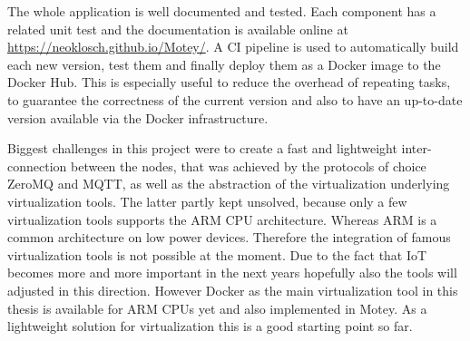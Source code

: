 The whole application is well documented and tested.
Each component has a related unit test and the documentation is available online at \url{https://neoklosch.github.io/Motey/}.
A \ac{CI} pipeline is used to automatically build each new version, test them and finally deploy them as a Docker image to the Docker Hub.
This is especially useful to reduce the overhead of repeating tasks, to guarantee the correctness of the current version and also to have an up-to-date version available via the Docker infrastructure.

Biggest challenges in this project were to create a fast and lightweight inter-connection between the nodes, that was achieved by the protocols of choice ZeroMQ and \ac{MQTT}, as well as the abstraction of the virtualization underlying virtualization tools.
The latter partly kept unsolved, because only a few virtualization tools supports the ARM \ac{CPU} architecture.
Whereas ARM is a common architecture on low power devices.
Therefore the integration of famous virtualization tools is not possible at the moment.
Due to the fact that \ac{IoT} becomes more and more important in the next years hopefully also the tools will adjusted in this direction.
However Docker as the main virtualization tool in this thesis is available for ARM \acp{CPU} yet and also implemented in Motey.
As a lightweight solution for virtualization this is a good starting point so far.


%
%



